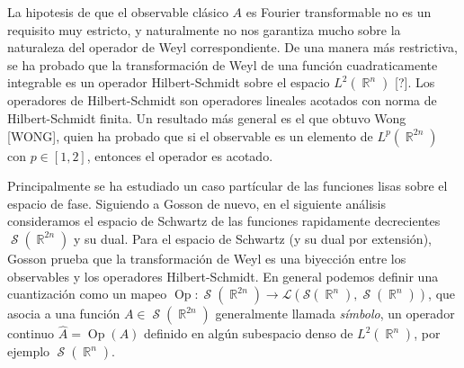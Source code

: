 \documentclass[a4paper]{report}
\DeclareMathOperator{\R}{\mathbb{R}}
\DeclareMathOperator{\Sz}{\mathcal S}
\DeclareMathOperator{\Op}{Op}
\begin{document}
  La hipotesis de que el observable clásico $A$ es Fourier
  transformable no es un requisito muy estricto, y
  naturalmente no nos garantiza mucho sobre la naturaleza
  del operador de Weyl correspondiente. De una manera más
  restrictiva, se ha probado que la transformación de Weyl
  de una función cuadraticamente integrable es un operador
  Hilbert-Schmidt sobre el espacio $L^2(\R^{n})$ [?]. Los
  operadores de Hilbert-Schmidt son operadores lineales
  acotados con norma de Hilbert-Schmidt finita. Un resultado
  más general es el que obtuvo Wong [WONG], quien ha probado
  que si el observable es un elemento de $L^{p}(\R^{2n})$
  con $p \in [1,2]$, entonces el operador es acotado.
  
  Principalmente se ha estudiado un caso partícular de las
  funciones lisas sobre el espacio de fase. Siguiendo a
  Gosson de nuevo, en el siguiente análisis consideramos el
  espacio de Schwartz de las funciones rapidamente
  decrecientes $\Sz(\R^{2n})$ y su dual. Para el espacio de
  Schwartz (y su dual por extensión), Gosson prueba que la
  transformación de Weyl es una biyección entre los
  observables y los operadores Hilbert-Schmidt. En general
  podemos definir una cuantización como un mapeo $\Op :
  \Sz(\R^{2n}) \to \mathcal L\left(\mathcal S(\R^{n}),
  \Sz(\R^{n})\right)$, que asocia a una función $A \in
  \Sz(\R^{2n})$ generalmente llamada \textit{símbolo}, un
  operador continuo $\hat{A} = \Op(A)$ definido en algún
  subespacio denso de $L^2(\R^{n})$, por ejemplo
  $\Sz(\R^{n})$.
\end{document}
